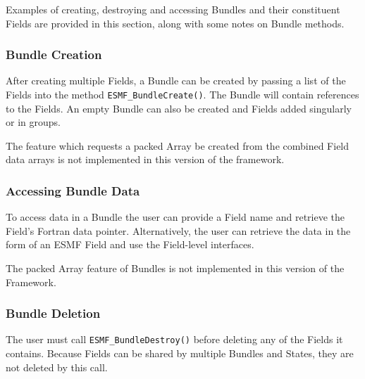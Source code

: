

Examples of creating, destroying and accessing Bundles and their
constituent Fields are provided in this section, along with some
notes on Bundle methods.

\subsubsection{Bundle Creation}

After creating multiple Fields, a Bundle
can be created by passing a list of the Fields into the 
method {\tt ESMF\_BundleCreate()}.  The Bundle will contain
references to the Fields.  An empty Bundle can also be created
and Fields added singularly or in groups. 

The feature which requests a packed Array be created from the
combined Field data arrays is not implemented in this version
of the framework.

\subsubsection{Accessing Bundle Data}

To access data in a Bundle the user can provide a Field
name and retrieve the Field's Fortran data pointer.  Alternatively,
the user can retrieve the data in the form of an ESMF 
Field and use the Field-level interfaces.

The packed Array feature of Bundles is not implemented in
this version of the Framework.

\subsubsection{Bundle Deletion}

The user must call {\tt ESMF\_BundleDestroy()} before 
deleting any of the Fields it contains.  Because Fields
can be shared by multiple Bundles and States, they are
not deleted by this call.


